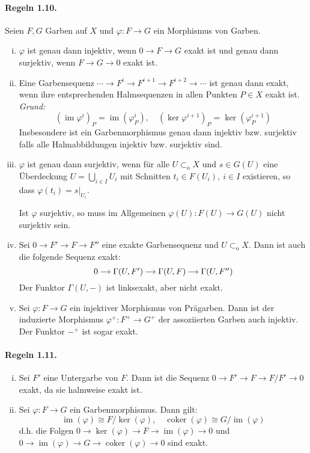 \paragraph{Regeln 1.10.}\label{1.10} Seien $F,G$ Garben auf $X$ und $\varphi:F\to G$ ein Morphismus von Garben.
\begin{enumerate}[(i)]
\item $\varphi$ ist genau dann injektiv, wenn $0\to F\to G$ exakt ist und genau dann surjektiv, wenn $F\to G\to 0$ exakt ist.
\item Eine Garbensequenz $\cdots \to F^i\to F^{i+1}\to F^{i+2}\to\cdots$ ist genau dann exakt, wenn ihre entsprechenden Halmsequenzen in allen Punkten $P\in X$ exakt ist. \textit{Grund:}
\[(\operatorname{im} \varphi^i)_P=\operatorname{im}(\varphi^i_P),\quad (\ker\varphi^{i+1})_P=\ker(\varphi^{i+1}_P) \]
Insbesondere ist ein Garbenmorphismus genau dann injektiv bzw. surjektiv falls alle Halmabbildungen injektiv bzw. surjektiv sind.
\item $\varphi$ ist genau dann surjektiv, wenn für alle $U\subset_\text{o}X$ und $s\in G(U)$ eine Überdeckung $U=\bigcup_{i\in I} U_i$ mit Schnitten $t_i\in F(U_i),\ i\in I$ existieren, so dass $\varphi(t_i)=s|_{U_i}$.

Ist $\varphi$ surjektiv, so muss im Allgemeinen $\varphi(U):F(U)\to G(U)$ nicht surjektiv sein.
\item Sei $0\to F'\to F\to F''$ eine exakte Garbensequenz und $U\subset_\text{o}X$. Dann ist auch die folgende Sequenz exakt:
\[\begin{tikzcd}[cramped, sep=small]
0 \ar[r] & \Gamma(U,F') \ar[r]& \Gamma(U,F) \ar[r]& \Gamma(U,F'')
\end{tikzcd} \]
Der Funktor $\Gamma(U,-)$ ist linksexakt, aber nicht exakt.
\item Sei $\varphi:F\to G$ ein injektiver Morphismus von Prägarben. Dann ist der induzierte Morphismus $\varphi^+:F^+\to G^+$ der assoziierten Garben auch injektiv. Der Funktor $-^+$ ist sogar exakt.
\end{enumerate}

\paragraph{Regeln 1.11.}\label{1.11} \begin{enumerate}[(i)]
\item Sei $F'$ eine Untergarbe von $F$. Dann ist die Sequenz $0\to F'\to F\to F/F'\to 0$ exakt, da sie halmweise exakt ist.
\item Sei $\varphi:F\to G$ ein Garbenmorphismus. Dann gilt:
\[\operatorname{im}(\varphi)\cong F/\ker(\varphi),\quad \operatorname{coker}(\varphi)\cong G/ \operatorname{im}(\varphi) \]
d.h. die Folgen $0\to\ker(\varphi)\to F\to\operatorname{im}(\varphi)\to 0$ und $0\to\operatorname{im}(\varphi)\to G\to\operatorname{coker}(\varphi)\to 0$ sind exakt.
\end{enumerate}

